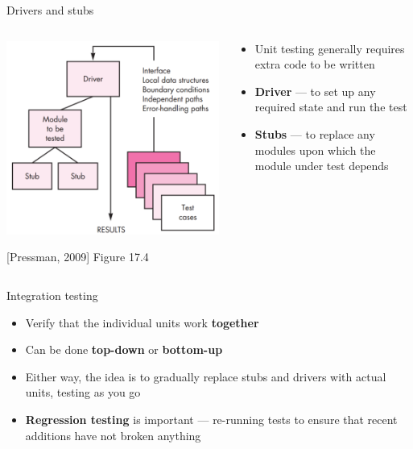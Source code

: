 \begin{frame}{Drivers and stubs}
    \begin{columns}
        \begin{column}{0.48\textwidth}
            \begin{center}
                \includegraphics[width=\textwidth]{pressman_17_4}
                
                {\tiny [Pressman, 2009] Figure 17.4}
            \end{center}
        \end{column}
        \begin{column}{0.48\textwidth}
            \begin{itemize}
                \item Unit testing generally requires extra code to be written \pause
                \item \textbf{Driver} --- to set up any required state and run the test \pause
                \item \textbf{Stubs} --- to replace any modules upon which the module under test depends
            \end{itemize}
        \end{column}
    \end{columns}
\end{frame}

\begin{frame}{Integration testing}
    \begin{itemize}
        \item Verify that the individual units work \textbf{together} \pause
        \item Can be done \textbf{top-down} or \textbf{bottom-up} \pause
        \item Either way, the idea is to gradually replace stubs and drivers with actual units,
            testing as you go \pause
        \item \textbf{Regression testing} is important --- re-running tests to ensure that recent additions
            have not broken anything
    \end{itemize}
\end{frame}

